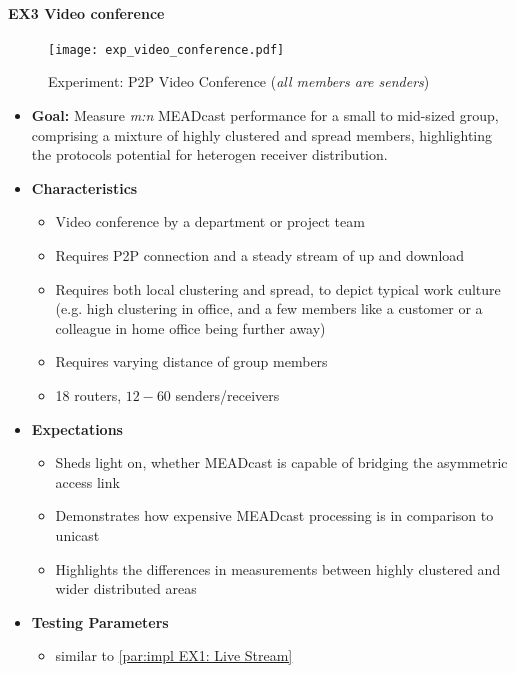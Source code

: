 \paragraph{EX3 Video conference} %
\label{par:impl EX3 Video conference}

\begin{figure}[!htbp]
    \begin{center}
        \texttt{[image: exp\_video\_conference.pdf]}
    \end{center}
    \caption{Experiment: P2P Video Conference
        (\textit{all members are senders})}
    \label{fig:exp_video_conference}
\end{figure}

\begin{itemize}\itemsep0em
    \item \textbf{Goal:} Measure \textit{m:n} MEADcast performance for a
        small to mid-sized group, comprising a mixture of highly clustered and
        spread members, highlighting the protocols potential for heterogen
        receiver distribution.
    \item[] \textbf{Characteristics}
    \begin{itemize}\itemsep0em
        \item Video conference by a department or project team
        \item Requires P2P connection and a steady stream of up and download
            \cite{cartesian_us_bw}
        \item Requires both local clustering and spread, to depict typical work
            culture (e.g. high clustering in office, and a few members like
            a customer or a colleague in home office being further away)
        \item Requires varying distance of group members
        \item 18 routers, $12-60$ senders/receivers
    \end{itemize}
    \item[] \textbf{Expectations}
    \begin{itemize}\itemsep0em
        \item Sheds light on, whether MEADcast is capable of bridging the
            asymmetric access link \cite{xcast_rfc, cartesian_us_bw}
        \item Demonstrates how expensive MEADcast processing is in comparison
            to unicast
        \item Highlights the differences in measurements between highly
            clustered and wider distributed areas
    \end{itemize}
    \item[] \textbf{Testing Parameters}
    \begin{itemize}\itemsep0em
        \item similar to \autoref{par:impl EX1: Live Stream}
    \end{itemize}
\end{itemize}
\newpage

